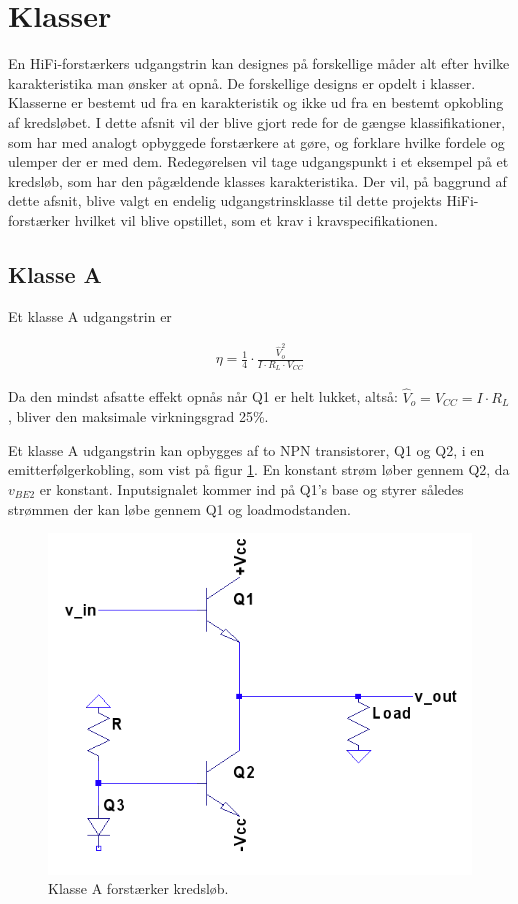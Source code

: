 \section{Klasser}
En HiFi-forstærkers udgangstrin kan designes på forskellige måder alt efter hvilke karakteristika man ønsker at opnå. De forskellige designs er opdelt i klasser. Klasserne er bestemt ud fra en karakteristik og ikke ud fra en bestemt opkobling af kredsløbet. 
I dette afsnit vil der blive gjort rede for de gængse klassifikationer, som har med analogt opbyggede forstærkere at gøre, og forklare hvilke fordele og ulemper der er med dem. Redegørelsen vil tage udgangspunkt i et eksempel på et kredsløb, som har den pågældende klasses karakteristika. 
Der vil, på baggrund af dette afsnit, blive valgt en endelig udgangstrinsklasse til dette projekts HiFi-forstærker hvilket vil blive opstillet, som et krav i kravspecifikationen.

\subsection{Klasse A}

Et klasse A udgangstrin er 

\begin{eqnarray}
\eta=\frac{1}{4} \cdot \frac{\hat{V}_o^2}{I \cdot R_L \cdot V_{CC}}  \label{eq:classa}
\end{eqnarray}

Da den mindst afsatte effekt opnås når Q1 er helt lukket, altså: $ \hat{V}_o=V_{CC}=I \cdot R_L $, bliver den maksimale virkningsgrad 25\%.

Et klasse A udgangstrin kan opbygges af to NPN transistorer, Q1 og Q2, i en emitterfølgerkobling, som vist på figur \ref{fig:classa}. En konstant strøm løber gennem Q2, da $v_{BE2}$ er konstant. Inputsignalet kommer ind på Q1's base og styrer således strømmen der kan løbe gennem Q1 og loadmodstanden. 

\begin{figure}[h]
\centering
\includegraphics[scale=.35]{indledende_analyse/klasser/classa.png}
\caption{Klasse A forstærker kredsløb.}
\label{fig:classa}
\end{figure}

